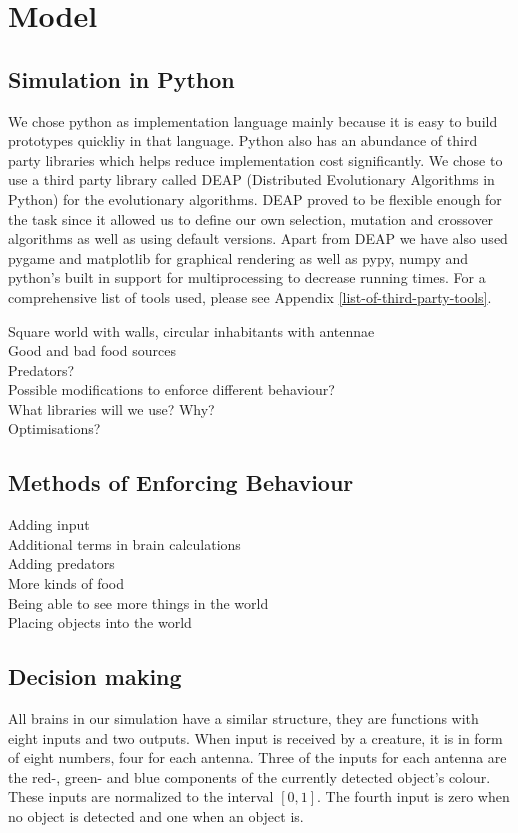 \documentclass[a4paper,11pt]{kth-mag}
\begin{document}
\section{Model}
\subsection{Simulation in Python}

We chose python as implementation language mainly because it is easy to build prototypes quickliy in that language. Python also has an abundance of third party libraries which helps reduce implementation cost significantly. We chose to use a third party library called DEAP (Distributed Evolutionary Algorithms in Python) for the evolutionary algorithms. DEAP proved to be flexible enough for the task since it allowed us to define our own selection, mutation and crossover algorithms as well as using default versions. Apart from DEAP we have also used pygame and matplotlib for graphical rendering as well as pypy, numpy and python's built in support for multiprocessing to decrease running times. For a comprehensive list of tools used, please see Appendix \ref{list-of-third-party-tools}.



Square world with walls, circular inhabitants with antennae\\
Good and bad food sources\\
Predators?\\
Possible modifications to enforce different behaviour?\\
What libraries will we use? Why?\\
Optimisations?\\

\subsection{Methods of Enforcing Behaviour}
Adding input\\
Additional terms in brain calculations\\
Adding predators\\
More kinds of food\\
Being able to see more things in the world\\
Placing objects into the world\\
\subsection{Decision making}
All brains in our simulation have a similar structure, they are functions with eight inputs and two outputs. When input is received by a creature, it is in form of eight numbers, four for each antenna. Three of the inputs for each antenna are the red-, green- and blue components of the currently detected object's colour. These inputs are normalized to the interval $[0,1]$. The fourth input is zero when no object is detected and one when an object is. 
\end{document}
